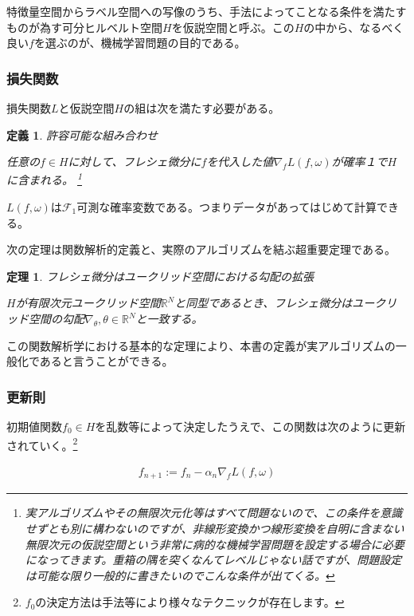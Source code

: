 \documentclass{jsarticle}
\newtheorem{theo}{定理}[section]
\newtheorem{defi}{定義}[section]
\begin{document}
特徴量空間からラベル空間への写像のうち、手法によってことなる条件を満たすものが為す可分ヒルベルト空間$H$を仮説空間と呼ぶ。この$H$の中から、なるべく良い$f$を選ぶのが、機械学習問題の目的である。



\subsubsection{損失関数}

損失関数$L$と仮説空間$H$の組は次を満たす必要がある。
\begin{defi} 許容可能な組み合わせ

任意の$f\in H$に対して、フレシェ微分に$f$を代入した値$\nabla_fL(f,\omega)$が確率１で$H$に含まれる。
\footnote{実アルゴリズムやその無限次元化等はすべて問題ないので、この条件を意識せずとも別に構わないのですが、非線形変換かつ線形変換を自明に含まない無限次元の仮説空間という非常に病的な機械学習問題を設定する場合に必要になってきます。重箱の隅を突くなんてレベルじゃない話ですが、問題設定は可能な限り一般的に書きたいのでこんな条件が出てくる。}
\end{defi}

$L(f,\omega)$は$\mathcal{F}_1$可測な確率変数である。つまりデータがあってはじめて計算できる。

次の定理は関数解析的定義と、実際のアルゴリズムを結ぶ超重要定理である。

\begin{theo}フレシェ微分はユークリッド空間における勾配の拡張

$H$が有限次元ユークリッド空間$\mathbb{R}^N$と同型であるとき、フレシェ微分はユークリッド空間の勾配$\nabla_\theta,\theta\in\mathbb{R}^N$と一致する。

\end{theo}

この関数解析学における基本的な定理により、本書の定義が実アルゴリズムの一般化であると言うことができる。

\subsubsection{更新則}

初期値関数$f_0\in H$を乱数等によって決定したうえで、この関数は次のように更新されていく。\footnote{$f_0$の決定方法は手法等により様々なテクニックが存在します。}

\begin{align}
f_{n+1}:=f_n-\alpha_n \nabla_f L(f,\omega)
\end{align}
\end{document}
